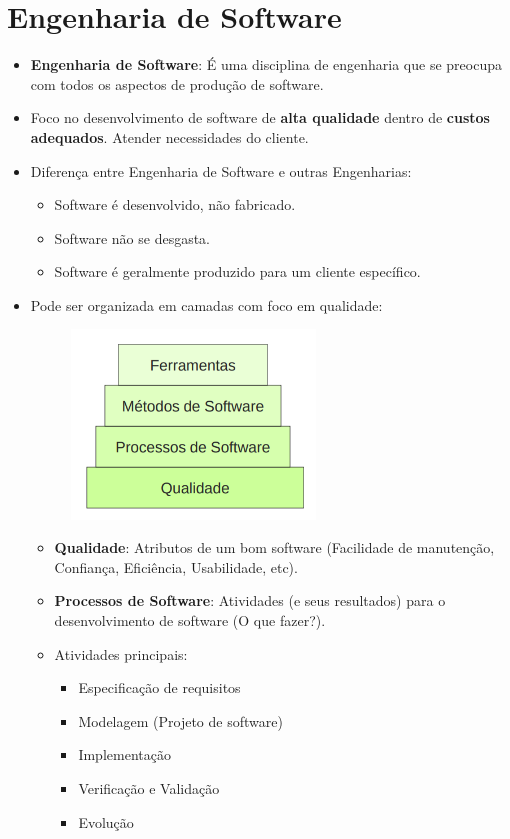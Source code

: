 \documentclass[a4paper, 11pt]{article}
\begin{document}
\section{Engenharia de Software}
\begin{itemize}
	\item \textbf{Engenharia de Software}: É uma disciplina de engenharia que se preocupa com todos os aspectos de produção de software.
	\item Foco no desenvolvimento de software de \textbf{alta qualidade} dentro de \textbf{custos adequados}. Atender necessidades do cliente.		
	
	\item Diferença entre Engenharia de Software e outras Engenharias:
	\begin{itemize}
		\item Software é desenvolvido, não fabricado.
		\item Software não se desgasta.
		\item Software é geralmente produzido para um cliente específico.
	\end{itemize}
	
	\item Pode ser organizada em camadas com foco em qualidade:
	\begin{figure}[h]
		\includegraphics[width=6.5cm]{camadas_eng_soft}
		\centering
	\end{figure}

	\begin{itemize}
		\item \textbf{Qualidade}: Atributos de um bom software (Facilidade de manutenção, Confiança, Eficiência, Usabilidade, etc).
		
		\item \textbf{Processos de Software}: Atividades (e seus resultados) para o desenvolvimento de software (O que fazer?).
		\item Atividades principais:
		\begin{itemize}
			\item Especificação de requisitos
			\item Modelagem (Projeto de software)
			\item Implementação
			\item Verificação e Validação
			\item Evolução
		\end{itemize}
		

\end{itemize}
\end{itemize}
\end{document}
